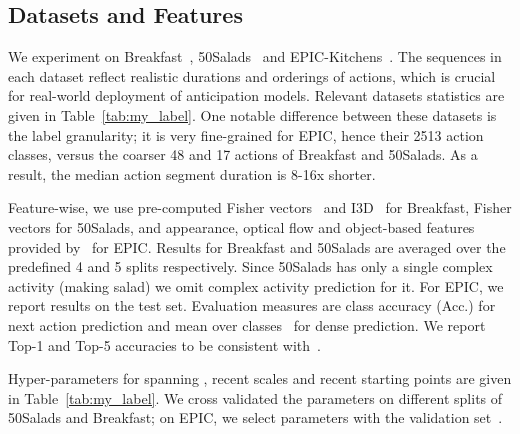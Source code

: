 \documentclass[runningheads]{llncs}
\begin{document}
\subsection{Datasets and Features}\label{sec:datasets}
We experiment on  Breakfast~\cite{kuehne2014language}, 50Salads~\cite{stein2013combining} and EPIC-Kitchens~\cite{damen2018scaling}. The sequences in each dataset reflect realistic durations and orderings of actions, which is crucial for real-world deployment of anticipation models. Relevant datasets statistics  are given in Table~\ref{tab:my_label}. One notable difference between these datasets is the label granularity; it is very fine-grained for EPIC, hence their 2513 action classes, versus the coarser 48 and 17 actions of Breakfast and 50Salads. As a result, the median action segment duration is 8-16x shorter.
 
Feature-wise, we use pre-computed Fisher vectors~\cite{abu2018will} and I3D~\cite{carreira2017quo} for Breakfast, Fisher vectors for 50Salads, and appearance, optical flow and object-based features  provided by~\cite{furnari2019rulstm} for EPIC. Results for Breakfast and 50Salads are averaged over the predefined 4 and 5 splits respectively. Since 50Salads has only a single complex activity (making salad) we omit complex activity prediction for it. For EPIC, we report results on the test set. Evaluation measures are class accuracy (Acc.) for next action prediction and mean over classes~\cite{abu2018will} for dense prediction. We report Top-1 and Top-5 accuracies to be consistent with~\cite{miech2019leveraging,furnari2019rulstm}. 

Hyper-parameters for spanning , recent scales  and recent starting points  are given in Table~\ref{tab:my_label}. We cross validated the parameters on different splits of 50Salads and Breakfast; on EPIC, we select parameters with the validation set~\cite{furnari2019rulstm}. 

\begin{table}[t!]
\centering
{}
\caption{Dataset details and our respective model parameters.}
\label{tab:my_label}
\end{table} 
\end{document}
